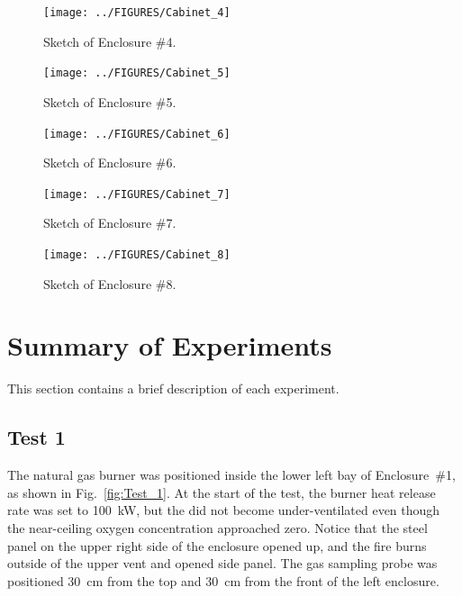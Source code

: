 \documentclass[12pt]{article}
\begin{document}
\begin{figure}[p]
\begin{center}
\texttt{[image: ../FIGURES/Cabinet\_4]}
\end{center}
\caption{Sketch of Enclosure \#4.}
\label{Cabinet_4}
\end{figure}

\begin{figure}[p]
\begin{center}
\texttt{[image: ../FIGURES/Cabinet\_5]}
\end{center}
\caption{Sketch of Enclosure \#5.}
\label{Cabinet_5}
\end{figure}

\begin{figure}[p]
\begin{center}
\texttt{[image: ../FIGURES/Cabinet\_6]}
\end{center}
\caption{Sketch of Enclosure \#6.}
\label{Cabinet_6}
\end{figure}

\begin{figure}[p]
\begin{center}
\texttt{[image: ../FIGURES/Cabinet\_7]}
\end{center}
\caption{Sketch of Enclosure \#7.}
\label{Cabinet_7}
\end{figure}

\begin{figure}[p]
\begin{center}
\texttt{[image: ../FIGURES/Cabinet\_8]}
\end{center}
\caption{Sketch of Enclosure \#8.}
\label{Cabinet_8}
\end{figure}


\newpage

\section{Summary of Experiments}
\label{experiments}

This section contains a brief description of each experiment.

\newpage

\subsection{Test 1}

The natural gas burner was positioned inside the lower left bay of Enclosure~\#1, as shown in Fig.~\ref{fig:Test_1}. At the start of the test, the burner heat release rate was set to 100~kW, but the did not become under-ventilated even though the near-ceiling oxygen concentration approached zero. Notice that the steel panel on the upper right side of the enclosure opened up, and the fire burns outside of the upper vent and opened side panel. The gas sampling probe was positioned 30~cm from the top and 30~cm from the front of the left enclosure.
\end{document}
